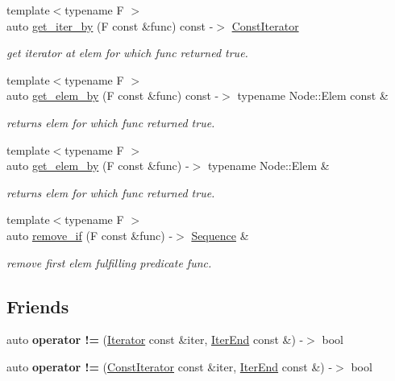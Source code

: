 \begin{DoxyCompactItemize}
{\footnotesize template$<$typename F $>$ }\\auto \mbox{\hyperlink{structSequence_a822870dcd8191a4c9e2ffe4033e3c374}{get\+\_\+iter\+\_\+by}} (F const \&func) const -\/$>$ \mbox{\hyperlink{structSequence_1_1ConstIterator}{Const\+Iterator}}
\begin{DoxyCompactList}\small\item\em get iterator at elem for which func returned true. \end{DoxyCompactList}\item 
{\footnotesize template$<$typename F $>$ }\\auto \mbox{\hyperlink{structSequence_ae55f7babbaa36d26f1599b9d16d79134}{get\+\_\+elem\+\_\+by}} (F const \&func) const -\/$>$ typename Node\+::\+Elem const \&
\begin{DoxyCompactList}\small\item\em returns elem for which func returned true. \end{DoxyCompactList}\item 
{\footnotesize template$<$typename F $>$ }\\auto \mbox{\hyperlink{structSequence_ae2a2c13841d5be141a98afc16919f543}{get\+\_\+elem\+\_\+by}} (F const \&func) -\/$>$ typename Node\+::\+Elem \&
\begin{DoxyCompactList}\small\item\em returns elem for which func returned true. \end{DoxyCompactList}\item 
{\footnotesize template$<$typename F $>$ }\\auto \mbox{\hyperlink{structSequence_a8bee122780d6248833649f4b42272f28}{remove\+\_\+if}} (F const \&func) -\/$>$ \mbox{\hyperlink{structSequence}{Sequence}} \&
\begin{DoxyCompactList}\small\item\em remove first elem fulfilling predicate func. \end{DoxyCompactList}\end{DoxyCompactItemize}
\subsection*{Friends}
\begin{DoxyCompactItemize}
\item 
\mbox{\label{structSequence_ad1cae2d5d75b3d88bff85e197355f217}} 
auto {\bfseries operator !=} (\mbox{\hyperlink{structSequence_1_1Iterator}{Iterator}} const \&iter, \mbox{\hyperlink{structSequence_1_1IterEnd}{Iter\+End}} const \&) -\/$>$ bool
\item 
\mbox{\label{structSequence_ac3a2f62e9d91af06e90748fc76eba489}} 
auto {\bfseries operator !=} (\mbox{\hyperlink{structSequence_1_1ConstIterator}{Const\+Iterator}} const \&iter, \mbox{\hyperlink{structSequence_1_1IterEnd}{Iter\+End}} const \&) -\/$>$ bool
\end{DoxyCompactItemize}



